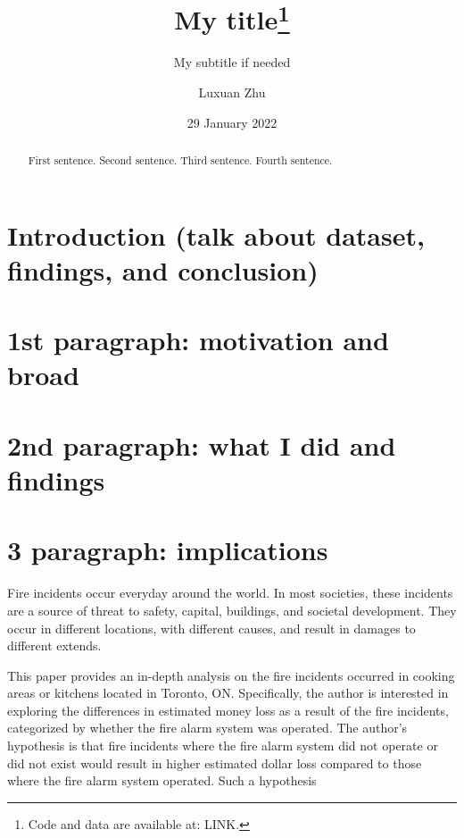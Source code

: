 \documentclass[
]{article}
\title{My title\thanks{Code and data are available at: LINK.}}
\subtitle{My subtitle if needed}
\author{Luxuan Zhu}
\date{29 January 2022}
\begin{document}
\maketitle
\begin{abstract}
First sentence. Second sentence. Third sentence. Fourth sentence.
\end{abstract}

\hypertarget{introduction-talk-about-dataset-findings-and-conclusion}{%
\section{Introduction (talk about dataset, findings, and conclusion)}\label{introduction-talk-about-dataset-findings-and-conclusion}}

\hypertarget{st-paragraph-motivation-and-broad}{%
\section{1st paragraph: motivation and broad}\label{st-paragraph-motivation-and-broad}}

\hypertarget{nd-paragraph-what-i-did-and-findings}{%
\section{2nd paragraph: what I did and findings}\label{nd-paragraph-what-i-did-and-findings}}

\hypertarget{paragraph-implications}{%
\section{3 paragraph: implications}\label{paragraph-implications}}

Fire incidents occur everyday around the world. In most societies, these incidents are a source of threat to safety, capital, buildings, and societal development. They occur in different locations, with different causes, and result in damages to different extends.

This paper provides an in-depth analysis on the fire incidents occurred in cooking areas or kitchens located in Toronto, ON. Specifically, the author is interested in exploring the differences in estimated money loss as a result of the fire incidents, categorized by whether the fire alarm system was operated. The author's hypothesis is that fire incidents where the fire alarm system did not operate or did not exist would result in higher estimated dollar loss compared to those where the fire alarm system operated. Such a hypothesis
\end{document}
